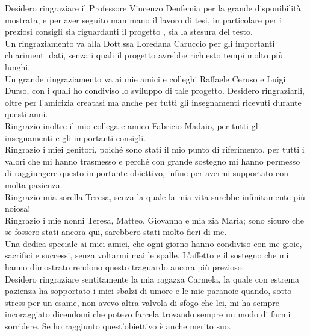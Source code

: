 Desidero ringraziare il Professore Vincenzo Deufemia per la grande disponibilità mostrata, e per aver seguito man mano il lavoro di tesi, in particolare
per i preziosi consigli sia riguardanti il progetto , sia la stesura del testo.\\
Un ringraziamento va alla Dott.ssa Loredana Caruccio per gli importanti
chiarimenti dati, senza i quali il progetto avrebbe richiesto tempi molto più lunghi.\\
Un grande ringraziamento va ai mie amici e colleghi Raffaele Ceruso e Luigi Durso, con i quali ho condiviso lo sviluppo di tale progetto. Desidero ringraziarli, oltre per l'amicizia creatasi ma anche per tutti gli insegnamenti ricevuti durante questi anni.\\
Ringrazio inoltre il mio collega e amico Fabricio Madaio, per tutti gli insegnamenti e gli importanti consigli.\\
Ringrazio i miei genitori, poiché sono stati il mio punto di riferimento, per tutti i valori che mi hanno trasmesso e perché con grande sostegno mi hanno permesso di raggiungere questo importante obiettivo, infine per avermi supportato con molta pazienza. \\
Ringrazio mia sorella Teresa, senza la quale la mia vita sarebbe infinitamente più noiosa! \\
Ringrazio i mie nonni Teresa, Matteo, Giovanna e mia zia Maria; sono sicuro che se fossero stati ancora qui, sarebbero stati molto fieri di me.\\
Una dedica speciale ai miei amici, che ogni giorno hanno condiviso con me gioie, sacrifici e successi, senza voltarmi mai le spalle. L’affetto e il sostegno che mi hanno dimostrato rendono questo traguardo ancora più prezioso.\\
Desidero ringraziare sentitamente la mia ragazza Carmela, la quale con estrema pazienza ha sopportato i miei sbalzi di umore e le mie paranoie quando, sotto stress per un esame, non avevo altra valvola di sfogo che lei, mi ha sempre incoraggiato dicendomi che potevo farcela trovando sempre un modo di farmi sorridere. Se ho raggiunto quest'obiettivo è anche merito suo. 